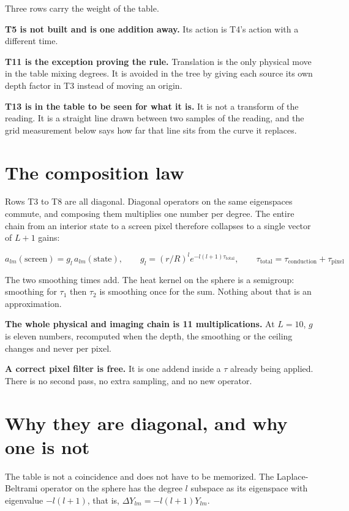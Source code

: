 Three rows carry the weight of the table.

\textbf{T5 is not built and is one addition away.} Its action is T4's action with a different time.

\textbf{T11 is the exception proving the rule.} Translation is the only physical move in the table mixing degrees. It is avoided in the tree by giving each source its own depth factor in T3 instead of moving an origin.

\textbf{T13 is in the table to be seen for what it is.} It is not a transform of the reading. It is a straight line drawn between two samples of the reading, and the grid measurement below says how far that line sits from the curve it replaces.

\section{The composition law}

Rows T3 to T8 are all diagonal. Diagonal operators on the same eigenspaces commute, and composing them multiplies one number per degree. The entire chain from an interior state to a screen pixel therefore collapses to a single vector of \(L+1\) gains:

\begin{center}
\(a_{lm}(\text{screen}) = g_l\, a_{lm}(\text{state}), \qquad g_l = (r/R)^l e^{-l(l+1)\tau_{\text{total}}}, \qquad \tau_{\text{total}} = \tau_{\text{conduction}} + \tau_{\text{pixel}}\)
\end{center}

The two smoothing times add. The heat kernel on the sphere is a semigroup: smoothing for \(\tau_1\) then \(\tau_2\) is smoothing once for the sum. Nothing about that is an approximation.

\textbf{The whole physical and imaging chain is 11 multiplications.} At \(L = 10\), \(g\) is eleven numbers, recomputed when the depth, the smoothing or the ceiling changes and never per pixel.

\textbf{A correct pixel filter is free.} It is one addend inside a \(\tau\) already being applied. There is no second pass, no extra sampling, and no new operator.

\section{Why they are diagonal, and why one is not}

The table is not a coincidence and does not have to be memorized. The Laplace-Beltrami operator on the sphere has the degree \(l\) subspace as its eigenspace with eigenvalue \(-l(l+1)\), that is, \(\Delta Y_{lm} = -l(l+1) Y_{lm}\).

